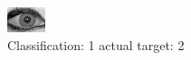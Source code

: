 \begin{figure}[h!]
\begin{center}
\includegraphics[width=0.60\columnwidth]{figures/ID1985_class_1_target_2.png}
\end{center}
\caption{ Classification: 1 actual target: 2}
\label{fig:ID1985_class_1_target_2}
\end{figure}
